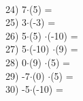 \documentclass[a4paper,10pt]{article}
\begin{document}
\vspace{0.5cm}\\24)   7$\cdot$(5) =
\vspace{0.5cm}\\25)   3$\cdot$(-3) =
\vspace{0.5cm}\\26)   5$\cdot$(5) $\cdot$(-10) =
\vspace{0.5cm}\\27)   5$\cdot$(-10) $\cdot$(9) =
\vspace{0.5cm}\\28)   0$\cdot$(9) $\cdot$(5) =
\vspace{0.5cm}\\29)   -7$\cdot$(0) $\cdot$(5) =
\vspace{0.5cm}\\30)   -5$\cdot$(-10) =
\vspace{0.5cm}\\\pagebreak
\end{document}
